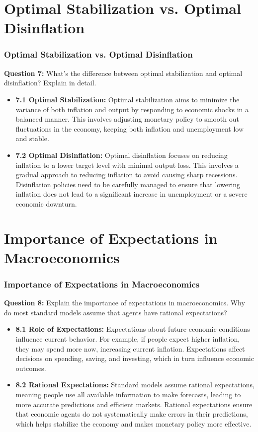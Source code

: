 \documentclass{beamer}
\begin{document}
\section{Optimal Stabilization vs. Optimal Disinflation}
\begin{frame}
    \frametitle{Optimal Stabilization vs. Optimal Disinflation}
    \textbf{Question 7:} What's the difference between optimal stabilization and optimal disinflation? Explain in detail.
    \begin{itemize}
        \item \textbf{7.1 Optimal Stabilization:} Optimal stabilization aims to minimize the variance of both inflation and output by responding to economic shocks in a balanced manner. This involves adjusting monetary policy to smooth out fluctuations in the economy, keeping both inflation and unemployment low and stable.
        \item \textbf{7.2 Optimal Disinflation:} Optimal disinflation focuses on reducing inflation to a lower target level with minimal output loss. This involves a gradual approach to reducing inflation to avoid causing sharp recessions. Disinflation policies need to be carefully managed to ensure that lowering inflation does not lead to a significant increase in unemployment or a severe economic downturn.
    \end{itemize}
\end{frame}

\section{Importance of Expectations in Macroeconomics}
\begin{frame}
    \frametitle{Importance of Expectations in Macroeconomics}
    \textbf{Question 8:} Explain the importance of expectations in macroeconomics. Why do most standard models assume that agents have rational expectations?
    \begin{itemize}
        \item \textbf{8.1 Role of Expectations:} Expectations about future economic conditions influence current behavior. For example, if people expect higher inflation, they may spend more now, increasing current inflation. Expectations affect decisions on spending, saving, and investing, which in turn influence economic outcomes.
        \item \textbf{8.2 Rational Expectations:} Standard models assume rational expectations, meaning people use all available information to make forecasts, leading to more accurate predictions and efficient markets. Rational expectations ensure that economic agents do not systematically make errors in their predictions, which helps stabilize the economy and makes monetary policy more effective.
    \end{itemize}
\end{frame}
\end{document}
